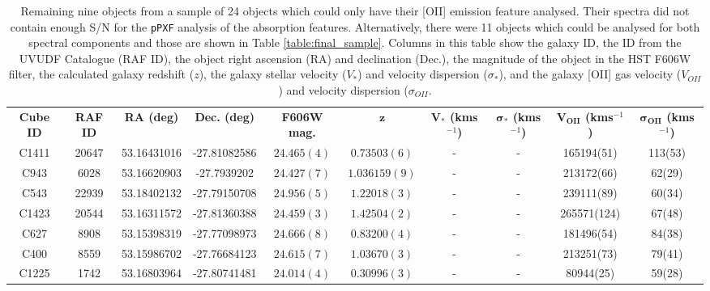 \documentclass[12pt, twocolumn, nofootinbib]{revtex4-1}    %
\begin{document}
\begin{table}
\centering
\begin{tabular}{c@{\hskip 10pt}c@{\hskip 10pt}c@{\hskip 10pt}c@{\hskip 10pt}c@{\hskip 10pt}c@{\hskip 10pt}c@{\hskip 10pt}c@{\hskip 10pt}c@{\hskip 10pt}c} 
 \hline
 \textbf{Cube ID} & \textbf{RAF ID} & \textbf{RA (deg)} & \textbf{Dec. (deg)} & \textbf{F606W mag.} & \textbf{$\boldsymbol{z}$} & \textbf{$\boldsymbol{V_*}$ (kms$^{-1}$)} & \textbf{$\boldsymbol{\sigma_*}$ (kms$^{-1}$)} & \textbf{$\boldsymbol{V_{OII}}$ (kms$^{-1}$)} & \textbf{$\boldsymbol{\sigma_{OII}}$ (kms$^{-1}$)} \\ [0.5ex]  
C1411 & 20647 & 53.16431016 & -27.81082586 & $24.465(4)$ & $0.73503(6)$ & - & - & 165194(51) & 113(53) \\ 

C943 & 6028 & 53.16620903 & -27.7939202 & $24.427(7)$ & $1.036159(9)$ & - & - & 213172(66) & 62(29) \\ 

C543 & 22939 & 53.18402132 & -27.79150708 & $24.956(5)$ & $1.22018(3)$ & - & - & 239111(89) & 60(34) \\ 

C1423 & 20544 & 53.16311572 & -27.81360388 & $24.459(3)$ & $1.42504(2)$ & - & - & 265571(124) & 67(48) \\ 

C627 & 8908 & 53.15398319 & -27.77098973 & $24.666(8)$ & $0.83200(4)$ & - & - & 181496(54) & 84(38) \\ 

C400 & 8559 & 53.15986702 & -27.76684123 & $24.615(7)$ & $1.03670(3)$ & - & - & 213251(73) & 79(41) \\ 

C1225 & 1742 & 53.16803964 & -27.80741481 & $24.014(4)$ & $0.30996(3)$ & - & - & 80944(25) & 59(28) \\
 \hline
\end{tabular}
\caption{Remaining nine objects from a sample of 24 objects which could only have their [OII] emission feature analysed. Their spectra did not contain enough S/N for the \texttt{pPXF} analysis of the absorption features. Alternatively, there were 11 objects which could be analysed for both spectral components and those are shown in Table \ref{table:final_sample}. Columns in this table show the galaxy ID, the ID from the UVUDF Catalogue \citep{2015AJ....150...31R} (RAF ID), the object right ascension (RA) and declination (Dec.), the magnitude of the object in the HST F606W filter, the calculated galaxy redshift ($z$), the galaxy stellar velocity ($V_*$) and velocity dispersion ($\sigma_*$), and the galaxy [OII] gas velocity ($V_{OII}$) and velocity dispersion ($\sigma_{OII}$. }
\label{table:rest_of_final_sample}
\end{table}
\end{document}
